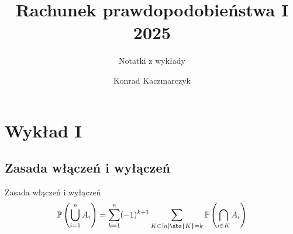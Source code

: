 \documentclass[11pt]{scrartcl}
\author{Konrad Kaczmarczyk}
\begin{document}
    \title{Rachunek prawdopodobieństwa I 2025}
    \subtitle{Notatki z wykłady}
    \maketitle

    \section{Wykład I}

    \subsection{Zasada włączeń i wyłączeń}

    \begin{twierdzenie}
        Zasada włączeń i wyłączeń
        \[
            \mathbb{P} \left ( \bigcup_{i = 1}^n  A_i \right ) = \sum_{k = 1}^{n} (-1)^{k + 1} \sum_{K \subset [n] \\ \abs{K} = k } \mathbb{P} \left ( \bigcap_{i \in K} A_i \right )    
        \]
        
    \end{twierdzenie}
    
    
\end{document}
